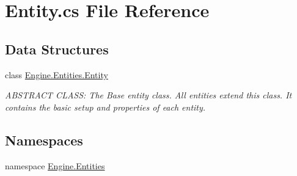 \hypertarget{a00017}{}\section{Entity.\+cs File Reference}
\label{a00017}
\subsection*{Data Structures}
\begin{DoxyCompactItemize}
\item 
class \hyperlink{a00314}{Engine.\+Entities.\+Entity}
\begin{DoxyCompactList}\small\item\em A\+B\+S\+T\+R\+A\+CT C\+L\+A\+SS\+: The Base entity class. All entities extend this class. It contains the basic setup and properties of each entity. \end{DoxyCompactList}\end{DoxyCompactItemize}
\subsection*{Namespaces}
\begin{DoxyCompactItemize}
\item 
namespace \hyperlink{a00242}{Engine.\+Entities}
\end{DoxyCompactItemize}
